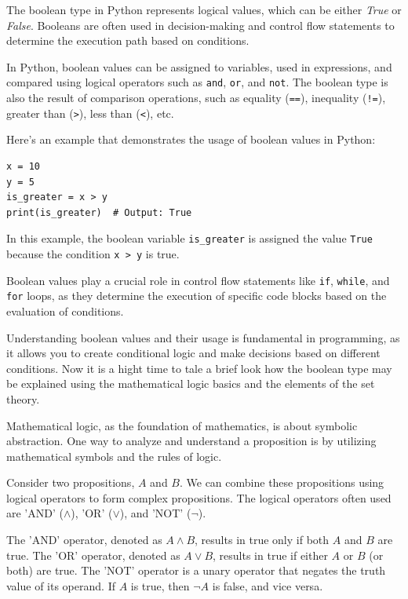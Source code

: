 \documentclass[12pt]{book}
\begin{document}
The boolean type in Python represents logical values, which can be either \textit{True} or \textit{False}. Booleans are often used in decision-making and control flow statements to determine the execution path based on conditions. 

In Python, boolean values can be assigned to variables, used in expressions, and compared using logical operators such as \texttt{and}, \texttt{or}, and \texttt{not}. The boolean type is also the result of comparison operations, such as equality (\texttt{==}), inequality (\texttt{!=}), greater than (\texttt{>}), less than (\texttt{<}), etc.

Here's an example that demonstrates the usage of boolean values in Python:

\begin{lstlisting}
x = 10
y = 5
is_greater = x > y
print(is_greater)  # Output: True
\end{lstlisting}

In this example, the boolean variable \texttt{is\_greater} is assigned the value \texttt{True} because the condition \texttt{x > y} is true.

Boolean values play a crucial role in control flow statements like \texttt{if}, \texttt{while}, and \texttt{for} loops, as they determine the execution of specific code blocks based on the evaluation of conditions.

Understanding boolean values and their usage is fundamental in programming, as it allows you to create conditional logic and make decisions based on different conditions. Now it is a hight time to tale a brief look how the boolean type may be explained using the mathematical logic basics and the elements of the set theory.


Mathematical logic, as the foundation of mathematics, is about symbolic abstraction. One way to analyze and understand a proposition is by utilizing mathematical symbols and the rules of logic.

Consider two propositions, \(A\) and \(B\). We can combine these propositions using logical operators to form complex propositions. The logical operators often used are 'AND' (\(\land\)), 'OR' (\(\lor\)), and 'NOT' (\(\neg\)).

The 'AND' operator, denoted as \(A \land B\), results in true only if both \(A\) and \(B\) are true. The 'OR' operator, denoted as \(A \lor B\), results in true if either \(A\) or \(B\) (or both) are true. The 'NOT' operator is a unary operator that negates the truth value of its operand. If \(A\) is true, then \(\neg A\) is false, and vice versa.
\end{document}
